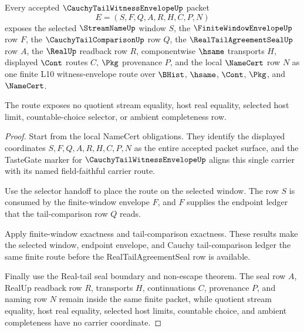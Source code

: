 \begin{theorem}
\label{thm:cauchy-tail-witness-envelope-scoped-route-binding}
Every accepted $\CauchyTailWitnessEnvelopeUp$ packet
$$
E=(S,F,Q,A,R,H,C,P,N)
$$
exposes the selected $\StreamNameUp$ window $S$, the $\FiniteWindowEnvelopeUp$ row $F$, the $\CauchyTailComparisonUp$ row $Q$, the $\RealTailAgreementSealUp$ row $A$, the $\RealUp$ readback row $R$, componentwise $\hsame$ transports $H$, displayed $\Cont$ routes $C$, $\Pkg$ provenance $P$, and the local $\NameCert$ row $N$ as one finite L10 witness-envelope route over $\BHist$, $\hsame$, $\Cont$, $\Pkg$, and $\NameCert$.

The route exposes no quotient stream equality, host real equality, selected host limit, countable-choice selector, or ambient completeness row.
\end{theorem}
\begin{proof}
Start from the local NameCert obligations. They identify the displayed coordinates $S,F,Q,A,R,H,C,P,N$ as the entire accepted packet surface, and the TasteGate marker for $\CauchyTailWitnessEnvelopeUp$ aligns this single carrier with its named field-faithful carrier route.

Use the selector handoff to place the route on the selected window. The row $S$ is consumed by the finite-window envelope $F$, and $F$ supplies the endpoint ledger that the tail-comparison row $Q$ reads.

Apply finite-window exactness and tail-comparison exactness. These results make the selected window, endpoint envelope, and Cauchy tail-comparison ledger the same finite route before the RealTailAgreementSeal row is available.

Finally use the Real-tail seal boundary and non-escape theorem. The seal row $A$, RealUp readback row $R$, transports $H$, continuations $C$, provenance $P$, and naming row $N$ remain inside the same finite packet, while quotient stream equality, host real equality, selected host limits, countable choice, and ambient completeness have no carrier coordinate.
\end{proof}


